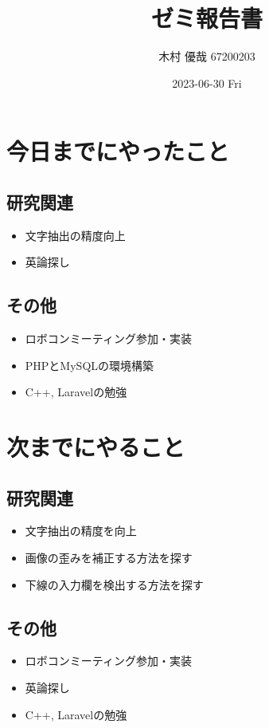 \documentclass[uplatex, onecolumn, 10pt]{jsarticle}
\begin{document}
\title{\vspace{-40mm}\bf{\LARGE{ゼミ報告書}}}
\author{\vspace{-40mm}木村 優哉 67200203}
\date{2023-06-30 Fri}
\maketitle


\section{今日までにやったこと}

\subsection*{研究関連}
\begin{itemize}
	\item 文字抽出の精度向上
	\item 英論探し
\end{itemize}

\subsection*{その他}
\begin{itemize}
	\item ロボコンミーティング参加・実装
	\item PHPとMySQLの環境構築
	\item C++, Laravelの勉強
\end{itemize}


\section{次までにやること}

\subsection*{研究関連}
\begin{itemize}
	\item 文字抽出の精度を向上
	\item 画像の歪みを補正する方法を探す
	\item 下線の入力欄を検出する方法を探す
\end{itemize}

\subsection*{その他}
\begin{itemize}
	\item ロボコンミーティング参加・実装
	\item 英論探し
	\item C++, Laravelの勉強
\end{itemize}
\end{document}
